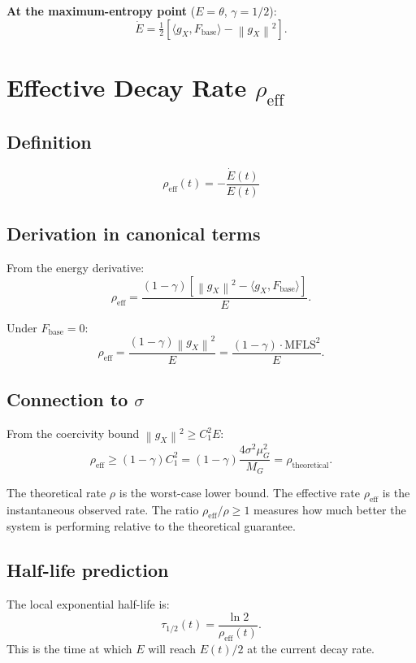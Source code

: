 \documentclass[11pt,a4paper]{article}
\theoremstyle{definition}
\newcommand{\norm}[1]{\left\|#1\right\|}
\newcommand{\Fbase}{F_{\mathrm{base}}}
\newcommand{\gX}{g_X}
\newcommand{\half}{\tfrac{1}{2}}
\newcommand{\mfls}{\mathrm{MFLS}}
\begin{document}
\textbf{At the maximum-entropy point} ($E = \theta$, $\gamma = 1/2$):
\[
\dot E = \half\left[\langle\gX,\Fbase\rangle - \norm{\gX}^2\right].
\]

\section{Effective Decay Rate $\rho_\mathrm{eff}$}

\subsection{Definition}

\begin{lockedbox}
\[
\rho_\mathrm{eff}(t) = -\frac{\dot E(t)}{E(t)}
\]
\end{lockedbox}

\subsection{Derivation in canonical terms}

From the energy derivative:
\[
\rho_\mathrm{eff} = \frac{(1-\gamma)\left[\norm{\gX}^2 - \langle\gX,\Fbase\rangle\right]}{E}.
\]

Under $\Fbase = 0$:
\[
\rho_\mathrm{eff} = \frac{(1-\gamma)\norm{\gX}^2}{E} = \frac{(1-\gamma)\cdot\mfls^2}{E}.
\]

\subsection{Connection to $\sigma$}

From the coercivity bound $\norm{\gX}^2 \geq C_1^2 E$:
\[
\rho_\mathrm{eff} \geq (1-\gamma)C_1^2 = (1-\gamma)\frac{4\sigma^2\mu_G^2}{M_G} = \rho_\text{theoretical}.
\]

The theoretical rate $\rho$ is the worst-case lower bound.
The effective rate $\rho_\mathrm{eff}$ is the instantaneous observed rate.
The ratio $\rho_\mathrm{eff}/\rho \geq 1$ measures how much better the system is
performing relative to the theoretical guarantee.

\subsection{Half-life prediction}

The local exponential half-life is:
\[
\tau_{1/2}(t) = \frac{\ln 2}{\rho_\mathrm{eff}(t)}.
\]
This is the time at which $E$ will reach $E(t)/2$ at the current decay rate.
\end{document}
